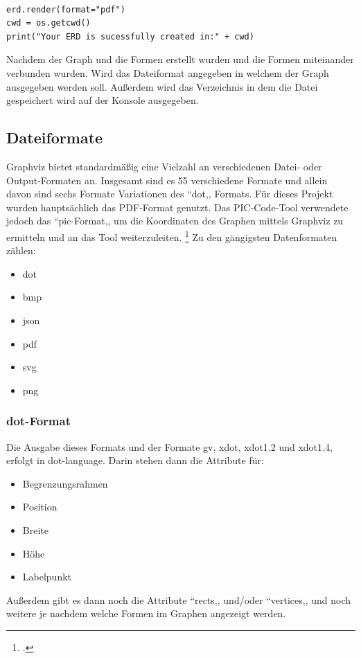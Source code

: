 \noindent
\lstset{language=Python}
\lstset{frame=lines}
\lstset{basicstyle=\footnotesize}
\begin{lstlisting}

erd.render(format="pdf")
cwd = os.getcwd()
print("Your ERD is sucessfully created in:" + cwd)

\end{lstlisting}

\noindent
Nachdem der Graph und die Formen erstellt wurden und die Formen miteinander verbunden wurden. Wird das Dateiformat angegeben in welchem der Graph ausgegeben werden soll. Außerdem wird das Verzeichnis in dem die Datei gespeichert wird auf der Konsole ausgegeben.


\newpage
\subsection{Dateiformate}
\fib{}
\noindent
Graphviz bietet standardmäßig eine Vielzahl an verschiedenen Datei- oder Output-Formaten an.
Insgesamt sind es 55 verschiedene Formate und allein davon sind sechs Formate Variationen des ``dot,, Formats. Für dieses Projekt wurden hauptsächlich das PDF-Format genutzt. Das PIC-Code-Tool verwendete jedoch das ``pic-Format,, um die Koordinaten des Graphen mittels Graphviz zu ermitteln und an das Tool weiterzuleiten.
\footcite{noauthor_output_nodate}
Zu den gängigsten Datenformaten zählen:
\begin{itemize}
	\item dot
	\item bmp
	\item json
	\item pdf
	\item svg
	\item png
\end{itemize}

\subsubsection{dot-Format}
Die Ausgabe dieses Formats und der Formate gv, xdot, xdot1.2 und xdot1.4, erfolgt in dot-language. 
Darin stehen dann die Attribute für:
\begin{itemize}
	\item Begrenzungsrahmen
	\item Position
	\item Breite
	\item Höhe
	\item Labelpunkt
\end{itemize}
\noindent
Außerdem gibt es dann noch die Attribute ``rects,, und/oder ``vertices,, und noch weitere je nachdem welche Formen im Graphen angezeigt werden.

